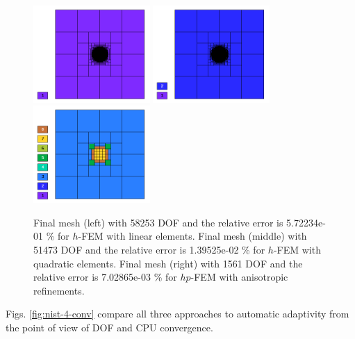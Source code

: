\documentclass[12pt]{elsarticle}
\begin{document}
\begin{figure}[H]
\centering
\includegraphics[height=3.7cm]{nist/nist-4/mesh_h1_aniso.png}
\includegraphics[height=3.7cm]{nist/nist-4/mesh_h2_aniso.png}
\includegraphics[height=3.7cm]{nist/nist-4/mesh_hp_aniso.png}
\caption{
Final mesh (left) with 58253 DOF and the relative error is 5.72234e-01 \% for $h$-FEM with linear elements.
Final mesh (middle) with 51473 DOF and the relative error is 1.39525e-02 \% for $h$-FEM with quadratic elements.
Final mesh (right) with 1561 DOF and the relative error is 7.02865e-03 \% for $hp$-FEM with anisotropic refinements.}
\label{fig:nist-4-hp-aniso}
\end{figure}

Figs. \ref{fig:nist-4-conv} compare all
three approaches to automatic adaptivity from the point
of view of DOF and CPU convergence.
\end{document}

